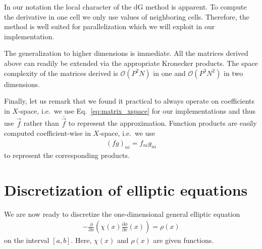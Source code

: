 In our notation the local character of the dG method is apparent.
To compute the derivative in one cell we only use values of neighboring
cells. Therefore, the method is well suited for parallelization which we
will exploit in our implementation.

The generalization to higher dimensions is immediate.  
All the 
matrices derived above can readily be extended via the appropriate Kronecker products.
The space complexity of 
the matrices derived is $\mathcal{O}(P^2 N)$ in one and $\mathcal{O}(P^3N^2)$ in two dimensions.

Finally, let us remark that we found it practical to always operate on 
coefficients in $X$-space, i.e.~we use Eq.~\eqref{eq:matrix_xspace}
for our implementations and thus use $\vec f$ rather than $\bar{\vec f}$ to represent the approximation. Function products are easily computed coefficient-wise in $X$-space, i.e.~we use
\begin{align}
    (fg)_{ni}=f_{ni}g_{ni}
    \label{}
\end{align}
to represent the corresponding products.

\section{Discretization of elliptic equations} \label{sec:elliptic}
We are now ready to discretize the one-dimensional general elliptic equation 
\begin{align}
    -\frac{\partial}{\partial x}\left( \chi(x)\frac{\partial \phi}{\partial x}(x)\right) = \rho(x)
    \label{eq:elliptic}
\end{align}
on the interval $[a,b]$. Here, $\chi(x)$ and $\rho(x)$ are given functions.

